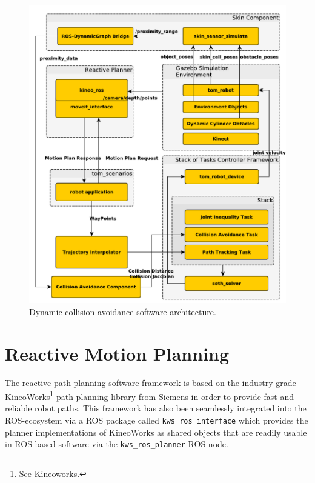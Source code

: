 \begin{figure}[t]
\centering
\includegraphics[scale=0.47]{doa/images/architecture_reactive_collision_1.pdf}
\caption[]{Dynamic collision avoidance software architecture.}
\label{fig:dca}
\end{figure}

\section{Reactive Motion Planning}
\label{subsec:react_path}
\hypersetup{colorlinks, linkcolor=blue}
The reactive path planning software framework is based on the industry grade KineoWorks\texttrademark\footnote{See
\href{http://www.plm.automation.siemens.com/en\_us/products/open/kineo/kineoworks/index.shtml}{Kineoworks}.} path planning library from Siemens in order to provide fast and reliable robot paths. This framework has also been seamlessly integrated into the ROS-ecosystem via a ROS package called \texttt{kws\_ros\_interface} which provides the planner implementations of KineoWorks as shared objects that are readily usable in ROS-based software via the \texttt{kws\_ros\_planner} ROS node.

